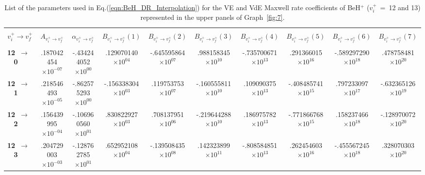 \documentclass[reviewcopy]{elsarticle}
\begin{document}
\begin{landscape}
\renewcommand{\thefootnote}{\fnsymbol{footnote}}
\renewcommand{\arraystretch}{0.81}
\scriptsize
\setlength\tabcolsep{1.2ex}
\begin{longtable}{lccccccccc}
\caption[table8]{List of the parameters used in Eq.(\ref{eqn:BeH_DR_Interpolation}) for the VE and VdE Maxwell rate coefficients of BeH$^+$  ($v^+_i$~=~12 and 13) represented in the upper panels of Graph~\ref{fig:7}.}\label{tab:BeH_VE_Interpolation12-13}\vspace{0.5cm}\\
\hline \\[-2ex]
   \multicolumn{1}{c}{$v^+_i \to v^+_f$} &
   \multicolumn{1}{c}{$A_{{v^+_i}\to {v^+_f}}$} &
   \multicolumn{1}{c}{$\alpha_{{v^+_i}\to {v^+_f}}$} &
   \multicolumn{1}{c}{$B_{{v^+_i}\to {v^+_f}}(1)$} &
   \multicolumn{1}{c}{$B_{{v^+_i}\to {v^+_f}}(2)$} &
   \multicolumn{1}{c}{$B_{{v^+_i}\to {v^+_f}}(3)$} &
   \multicolumn{1}{c}{$B_{{v^+_i}\to {v^+_f}}(4)$}  &
   \multicolumn{1}{c}{$B_{{v^+_i}\to {v^+_f}}(5)$} &
   \multicolumn{1}{c}{$B_{{v^+_i}\to {v^+_f}}(6)$} &
   \multicolumn{1}{c}{$B_{{v^+_i}\to {v^+_f}}(7)$} \\[5pt]
 \hline \\[-2ex]
\endhead
{\bf 12~$\to$~ 0}   &   .187042454$\times10^{-07}$ & -.434244052$\times10^{ 00}$ &  .129070140$\times10^{ 04}$ & -.645595864$\times10^{ 07}$ &  .988158345$\times10^{ 10}$ & -.735700671$\times10^{ 13}$ &  .291366015$\times10^{ 16}$ & -.589297290$\times10^{ 18}$ &  .478758481$\times10^{ 20}$ \\
{\bf 12~$\to$~ 1}   &   .218546493$\times10^{-05}$ & -.862575293$\times10^{ 00}$ & -.156338304$\times10^{ 03}$ &  .119753753$\times10^{ 07}$ & -.160555811$\times10^{ 10}$ &  .109090375$\times10^{ 13}$ & -.408485741$\times10^{ 15}$ &  .797233097$\times10^{ 17}$ & -.632365126$\times10^{ 19}$ \\
{\bf 12~$\to$~ 2}   &   .156439995$\times10^{-04}$ & -.106960560$\times10^{ 01}$ &  .830822927$\times10^{ 03}$ &  .708137951$\times10^{ 06}$ & -.219644288$\times10^{ 10}$ &  .186975782$\times10^{ 13}$ & -.771866768$\times10^{ 15}$ &  .158237466$\times10^{ 18}$ & -.128970072$\times10^{ 20}$ \\
{\bf 12~$\to$~ 3}   &   .204729003$\times10^{-03}$ & -.128762785$\times10^{ 01}$ &  .652952108$\times10^{ 04}$ & -.139508435$\times10^{ 08}$ &  .142323899$\times10^{ 11}$ & -.808584851$\times10^{ 13}$ &  .262454603$\times10^{ 16}$ & -.455567245$\times10^{ 18}$ &  .328070303$\times10^{ 20}$ \\

\end{longtable}
\end{landscape}
\end{document}
